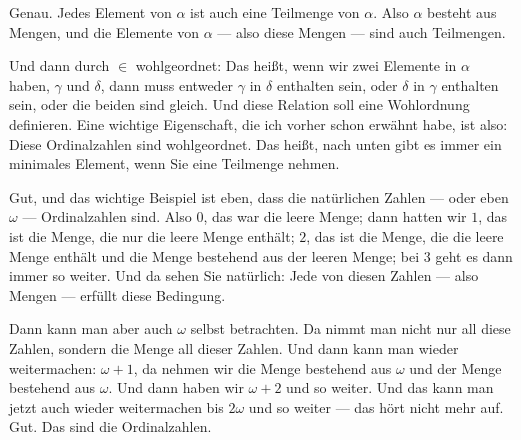 \begin{spoken-clean}[00:10:05 - 00:11:30]
Genau. Jedes Element von $\alpha$ ist auch eine Teilmenge von $\alpha$. Also $\alpha$ besteht aus Mengen, und die Elemente von $\alpha$ --- also diese Mengen --- sind auch Teilmengen.

Und dann durch $\in$ wohlgeordnet: Das heißt, wenn wir zwei Elemente in $\alpha$ haben, $\gamma$ und $\delta$, dann muss entweder $\gamma$ in $\delta$ enthalten sein, oder $\delta$ in $\gamma$ enthalten sein, oder die beiden sind gleich. Und diese Relation soll eine Wohlordnung definieren. Eine wichtige Eigenschaft, die ich vorher schon erwähnt habe, ist also: Diese Ordinalzahlen sind wohlgeordnet. Das heißt, nach unten gibt es immer ein minimales Element, wenn Sie eine Teilmenge nehmen.
\end{spoken-clean}

\begin{math-stroke}
\end{math-stroke}

\begin{ai-global-state-checkpoint-invisible-content}
\end{ai-global-state-checkpoint-invisible-content}

\begin{spoken-clean}[00:11:30 - 00:13:30]
Gut, und das wichtige Beispiel ist eben, dass die natürlichen Zahlen --- oder eben $\omega$ --- Ordinalzahlen sind. Also $0$, das war die leere Menge; dann hatten wir $1$, das ist die Menge, die nur die leere Menge enthält; $2$, das ist die Menge, die die leere Menge enthält und die Menge bestehend aus der leeren Menge; bei $3$ geht es dann immer so weiter. Und da sehen Sie natürlich: Jede von diesen Zahlen --- also Mengen --- erfüllt diese Bedingung.

Dann kann man aber auch $\omega$ selbst betrachten. Da nimmt man nicht nur all diese Zahlen, sondern die Menge all dieser Zahlen. Und dann kann man wieder weitermachen: $\omega + 1$, da nehmen wir die Menge bestehend aus $\omega$ und der Menge bestehend aus $\omega$. Und dann haben wir $\omega + 2$ und so weiter. Und das kann man jetzt auch wieder weitermachen bis $2\omega$ und so weiter --- das hört nicht mehr auf. Gut. Das sind die Ordinalzahlen.
\end{spoken-clean}

